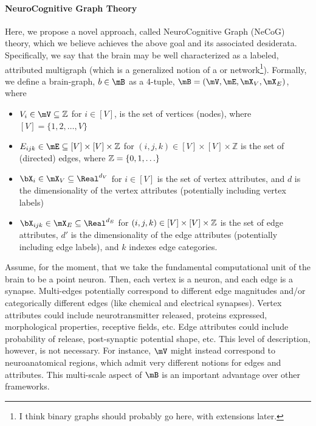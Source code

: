 \paragraph{NeuroCognitive Graph Theory}

Here, we propose a novel approach, called NeuroCognitive Graph (NeCoG) theory, which we believe achieves the above goal and its associated desiderata.  Specifically, we say that the brain may be well characterized as a labeled, attributed multigraph (which is a generalized notion of a or network\footnote{I think binary graphs should probably go here, with extensions later.}).  Formally, we define a brain-graph, $b\in \mB$ as a 4-tuple, $\mB=(\mV,\mE,\mX_V, \mX_E)$, where

\begin{itemize}
	\item $V_i \in \mV \subseteq \mathbb{Z}$ for $i \in [V]$, is the set of vertices (nodes), where $[V]=\{1,2,\ldots,V\}$ 
	\item $E_{ijk} \in \mE \subseteq [V] \times [V] \times \mathbb{Z}$ for $(i,j,k) \in [V] \times [V] \times \mathbb{Z}$ is the set of (directed) edges, where $\mathbb{Z}=\{0,1,\ldots\}$
	\item $\bX_i \in \mX_V \subseteq \Real^{d_V}$ for $i \in [V]$ is the set of vertex attributes, and $d$ is the dimensionality of the vertex attributes (potentially including vertex labels)
	\item $\bX_{ijk} \in \mX_E \subseteq \Real^{d_E}$ for $(i,j,k) \in [V] \times [V] \times \mathbb{Z}$ is the set of edge attributes, $d'$ is the dimensionality of the edge attributes (potentially including edge labels), and $k$ indexes edge categories.
\end{itemize}


Assume, for the moment, that we take the fundamental computational unit of the brain to be a point neuron.  Then, each vertex is a neuron, and each edge is a synapse.   Multi-edges potentially correspond to different edge magnitudes and/or categorically different edges (like chemical and electrical synapses). Vertex attributes could include neurotransmitter released, proteins expressed, morphological properties, receptive fields, etc.  Edge attributes could include probability of release, post-synaptic potential shape, etc.  This level of description, however, is not necessary.  For instance, $\mV$ might instead correspond to neuroanatomical regions, which admit very different notions for edges and attributes.  This multi-scale aspect of $\mB$ is an important advantage over other frameworks.  

